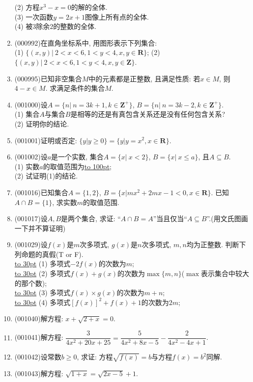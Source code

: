\documentclass[10pt,a4paper]{article}
\newcommand{\blank}[1]{\underline{\hbox to #1pt{}}}
\begin{document}
\begin{enumerate}[1.]
(2) 方程$x^3-x=0$的解的全体.\\ 
(3) 一次函数$y=2x+1$图像上所有点的全体.\\ 
(4) 被$3$除余$2$的整数的全体.
\item {\tiny (000992)}在直角坐标系中, 用图形表示下列集合:\\ 
(1) $\{(x,y)|\ 2<x<6,1<y<4,x,y\in\mathbf{R}\}$; \hfill (2) $\{(x,y)|\ 2<x<6,1<y<4,x,y\in\mathbf{Z}\}$.
\item {\tiny (000995)}已知非空集合$M$中的元素都是正整数, 且满足性质: 若$x\in M$, 则$4-x\in M$. 求满足条件的集合$M$.
\item {\tiny (001000)}设$A=\{n|\ n=3k+1,k \in \mathbf{Z}^+\}$, $B=\{n|\ n=3k-2,k \in \mathbf{Z}^+\}$.\\ 
(1) 集合$A$与集合$B$是相等的还是有真包含关系还是没有任何包含关系?\\ 
(2) 证明你的结论.
\item {\tiny (001001)}证明或否定: $\{y|y\ge 0\}=\{y|y=x^2, x \in \mathbf{R}\}$.
\item {\tiny (001002)}设$a$是一个实数, 集合$A=\{x|\ x<2\}$, $B=\{x|\ x\leq a\}$, 且$A \subseteq B$.\\ 
(1) 实数$a$的取值范围为\blank{100};\\ 
(2) 试证明(1)的结论.
\item {\tiny (001016)}已知集合$A=\{1,2\}$, $B=\{x|mx^2+2mx-1<0, x \in\mathbf{R}\}$. 已知$A \cap B=\{1\}$, 求实数$m$的取值范围.
\vspace*{8ex}
\item {\tiny (001017)}设$A,B$是两个集合, 求证: ``$A\cap B=A$''当且仅当``$A \subseteq B$''.(用文氏图画一下并不算证明)
\item {\tiny (001029)}设$f(x)$是$m$次多项式, $g(x)$是$n$次多项式, $m,n$均为正整数. 判断下列命题的真假(T or F).\\ 
\blank{30} (1) 多项式$-2f(x)$的次数为$m$;\\ 
\blank{30} (2) 多项式$f(x)+g(x)$的次数为$\max\{m,n\}$($\max$表示集合中较大的那个数);\\ 
\blank{30} (3) 多项式$f(x)\times g(x)$的次数为$m+n$;\\ 
\blank{30} (4) 多项式$[f(x)]^2+f(x)+1$的次数为$2m$;
\item {\tiny (001040)}解方程: $x+\sqrt{2+x}=0$.
\item {\tiny (001041)}解方程: $\dfrac{3}{4x^2+20x+25}=\dfrac{5}{4x^2+8x-5}-\dfrac{2}{4x^2-4x+1}$.
\item {\tiny (001042)}设常数$b\geq 0$, 求证: 方程$\sqrt{f(x)}=b$与方程$f(x)=b^2$同解.
\item {\tiny (001043)}解方程: $\sqrt{1+x}=\sqrt{2x-5}+1$.

\end{enumerate}
\end{document}

